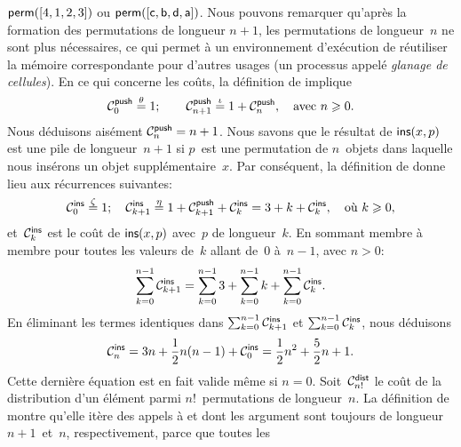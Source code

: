 \(\fun{perm}([4,1,2,3])\) ou \(\fun{perm}([\fun{c}, \fun{b}, \fun{d},
\fun{a}])\). Nous pouvons remarquer qu'après la formation des
permutations de longueur \(n+1\), les permutations de longueur~\(n\)
ne sont plus nécessaires, ce qui permet à un environnement d'exécution
de réutiliser la mémoire correspondante pour d'autres usages (un
processus appelé \emph{glanage de cellules}). En ce qui concerne les coûts, la définition de
 implique
\begin{equation*}
\C{\fun{push}}{0} \eqn{\theta} 1;\qquad
\C{\fun{push}}{n+1} \eqn{\iota} 1 + \C{\fun{push}}{n},\quad
\text{avec \(n \geqslant 0\)}.
\end{equation*}
Nous déduisons aisément \(\C{\fun{push}}{n} = n +
1\). Nous savons que le résultat de
\(\fun{ins}(x,p)\) est une pile de longueur~\(n+1\) si \(p\)~est une
permutation de \(n\)~objets dans laquelle nous insérons un objet
supplémentaire~\(x\). Par conséquent, la définition de 
donne lieu aux récurrences suivantes:
\begin{equation*}
\C{\fun{ins}}{0}   \eqn{\zeta} 1;\quad
\C{\fun{ins}}{k+1} \eqn{\eta} 1 + \C{\fun{push}}{k+1} +
\C{\fun{ins}}{k} = 3 + k + \C{\fun{ins}}{k}, \quad \text{où \(k
                    \geqslant 0\)},
\end{equation*}
et~\(\C{\fun{ins}}{k}\) est le coût de \(\fun{ins}(x,p)\) avec~\(p\)
de longueur~\(k\). En sommant membre à membre pour toutes les valeurs
de~\(k\) allant de~\(0\) à~\(n-1\), avec \({n>0}\):
\begin{equation*}
\sum_{k=0}^{n-1}{\C{\fun{ins}}{k+1}}
  = \sum_{k=0}^{n-1}{3} + \sum_{k=0}^{n-1}{k}
     + \sum_{k=0}^{n-1}{\C{\fun{ins}}{k}}.
\end{equation*}
En éliminant les termes identiques dans
\(\sum_{k=0}^{n-1}{\C{\fun{ins}}{k+1}}\) et
\(\sum_{k=0}^{n-1}{\C{\fun{ins}}{k}}\), nous
déduisons
\begin{equation*}
\C{\fun{ins}}{n}
  = 3n + \frac{1}{2}n(n-1) + \C{\fun{ins}}{0}
  = \frac{1}{2}{n^2} + \frac{5}{2}{n} + 1.
\end{equation*}
Cette dernière équation est en fait valide même si \({n = 0}\).
Soit~\(\C{\fun{dist}}{n!}\) le coût de la distribution d'un élément
parmi \(n!\)~permutations de longueur~\(n\). La définition de
 montre qu'elle itère des appels
à  et
 dont les argument sont toujours de
longueur \(n+1\)~et~\(n\), respectivement, parce que toutes les
